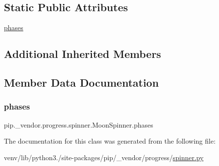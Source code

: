\subsection*{Static Public Attributes}
\begin{DoxyCompactItemize}
\item 
\hyperlink{classpip_1_1__vendor_1_1progress_1_1spinner_1_1MoonSpinner_a076ff710ee7f6ff7e93136ec32fe5185}{phases}
\end{DoxyCompactItemize}
\subsection*{Additional Inherited Members}


\subsection{Member Data Documentation}
\mbox{\label{classpip_1_1__vendor_1_1progress_1_1spinner_1_1MoonSpinner_a076ff710ee7f6ff7e93136ec32fe5185}} 
\subsubsection{\texorpdfstring{phases}{phases}}
{\footnotesize\ttfamily pip.\+\_\+vendor.\+progress.\+spinner.\+Moon\+Spinner.\+phases\hspace{0.3cm}{\ttfamily [static]}}



The documentation for this class was generated from the following file\+:\begin{DoxyCompactItemize}
\item 
venv/lib/python3./site-\/packages/pip/\+\_\+vendor/progress/\hyperlink{spinner_8py}{spinner.\+py}\end{DoxyCompactItemize}
